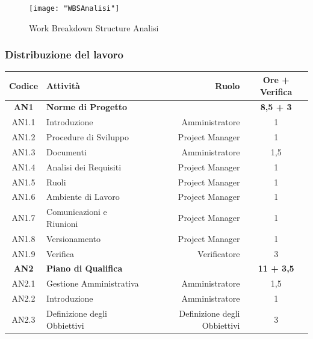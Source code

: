 \documentclass[12pt,a4paper,titlepage]{article}
\begin{document}
	\begin{figure}[p]
		\centering
		\texttt{[image: "WBSAnalisi"]}
		\caption{Work Breakdown Structure Analisi}
		\label{fig:WBSAnalisi}
	\end{figure}

	\subsubsection{Distribuzione del lavoro}{
		\small
			{\renewcommand\arraystretch{1.1} %
			\begin{tabular}{|c|l|r|c|}
				\hline
				{\textbf{Codice}}&{\textbf{Attività}}&{\textbf{Ruolo}}&{\textbf{Ore + Verifica}}\\
				\hline
				\textbf{AN1} & \textbf{Norme di Progetto} & & \textbf{8,5 + 3} \\
				
				AN1.1 & Introduzione & Amministratore & 1 \\
				
				AN1.2 & Procedure di Sviluppo & Project Manager & 1 \\
				
				AN1.3 & Documenti & Amministratore & 1,5 \\
				
				AN1.4 & Analisi dei Requisiti & Project Manager & 1 \\
				
				AN1.5 & Ruoli & Project Manager & 1 \\
				
				AN1.6 & Ambiente di Lavoro & Project Manager & 1 \\
				
				AN1.7 & Comunicazioni e Riunioni & Project Manager & 1 \\
				
				AN1.8 & Versionamento & Project Manager & 1 \\
				
				AN1.9 &	Verifica & Verificatore & 3 \\
				\hline
				\textbf{AN2} & \textbf{Piano di Qualifica} & & \textbf{11 + 3,5} \\
				
				AN2.1 & Gestione Amministrativa & Amministratore & 1,5 \\
				
				AN2.2 & Introduzione & Amministratore & 1 \\
				
				AN2.3 & Definizione degli Obbiettivi & Definizione degli Obbiettivi & 3 \\
				

\end{tabular}}}
\end{document}
